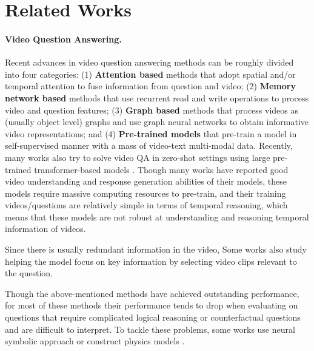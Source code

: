 \documentclass[letterpaper]{article} %
\begin{document}
\section{Related Works}

\paragraph{Video Question Answering.}
Recent advances in video question answering methods can be roughly divided into four categories:
(1) \textbf{Attention based} methods \cite{Zhang2019OpenEndedLV,Li2019BeyondRP,Kumar2019LeveragingTA} that adopt spatial and/or temporal attention to fuse information from question and video;
(2) \textbf{Memory network based} methods \cite{Xu2017VideoQA,Gao2018MotionAppearanceCN,Fan2019HeterogeneousME,Kim2019ProgressiveAM} that use recurrent read and write operations to process video and question features;
(3) \textbf{Graph based} methods \cite{Jin2021AdaptiveSG,seo2021attend,Xiao2021VideoAC, Cherian2022251D, Park2021BridgeTA,Zhao2022Collaborative} that process videos as (usually object level) graphs and use graph neural networks to obtain informative video representations; and
(4) \textbf{Pre-trained models} \cite{Lei2021LessIM,Fu2021VIOLETE,Zellers2021MERLOTMN,Zellers2022MERLOTRN,Wang2023Vstar} that pre-train a model in self-supervised manner with a mass of video-text multi-modal data. Recently, many works also try to solve video QA in zero-shot settings using large pre-trained transformer-based models \cite{Alayrac2022FlamingoAV, Li2023VideoChatCV, Zhang2023VideoLLaMAAI, Lyu2023MacawLLMML}. Though many works have reported good video understanding and response generation abilities of their models, these models require massive computing resources to pre-train, and their training videos/questions are relatively simple in terms of temporal reasoning, which means that these models are not robust at understanding and reasoning temporal information of videos.

Since there is usually redundant information in the video, Some works \cite{Kim2020ModalitySA, Gao2022MISTMI, Li2022InvariantGF} also study helping the model focus on key information by selecting video clips relevant to the question.

Though the above-mentioned methods have achieved outstanding performance, for most of these methods their performance tends to drop when evaluating on questions that require complicated logical reasoning or counterfactual questions and are difficult to interpret. To tackle these problems, some works use neural symbolic approach \cite{yi2019clevrer} \cite{Qian2022DynamicSM} or construct physics models \cite{Ding2021DynamicVR,chen2021grounding}.
\end{document}
